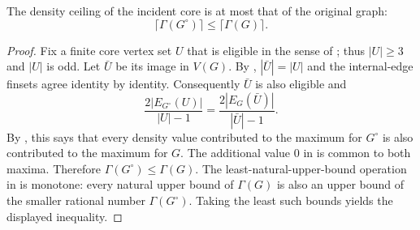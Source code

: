 \begin{lemma}
The density ceiling of the incident core is at most that of the original
graph:
\[
 \lceil\Gamma(G^{\circ})\rceil\leq\lceil\Gamma(G)\rceil.
\]
\end{lemma}
\begin{proof}
Fix a finite core vertex set $U$ that is eligible in the sense of
; thus $|U|\geq3$ and $|U|$ is odd.  Let $\bar U$
be its image in $V(G)$.  By ,
$|\bar U|=|U|$ and the internal-edge finsets agree identity by identity.
Consequently $\bar U$ is also eligible and
\[
 \frac{2|E_{G^{\circ}}(U)|}{|U|-1}
 =\frac{2|E_G(\bar U)|}{|\bar U|-1}.
\]
By , this says that every density value contributed
to the maximum for $G^{\circ}$ is also contributed to the maximum for $G$.
The additional value $0$ in  is common to both maxima.
Therefore $\Gamma(G^{\circ})\leq\Gamma(G)$.  The least-natural-upper-bound
operation in  is monotone: every natural upper bound of
$\Gamma(G)$ is also an upper bound of the smaller rational number
$\Gamma(G^{\circ})$.  Taking the least such bounds yields the displayed
inequality.
\end{proof}
